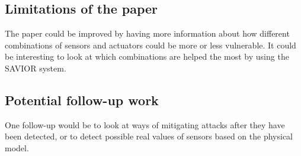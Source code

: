 \documentclass[11pt]{article}
\begin{document}
\subsection*{Limitations of the paper}

The paper could be improved by having more information about how different combinations of sensors and actuators could be more or less vulnerable.
It could be interesting to look at which combinations are helped the most by using the SAVIOR system.

\subsection*{Potential follow-up work}

One follow-up would be to look at ways of mitigating attacks after they have been detected, or to detect possible real values of sensors based on the physical model.
\end{document}
